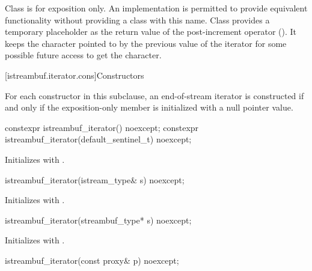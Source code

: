 \pnum
Class
is for exposition only.
An implementation is permitted to provide equivalent functionality without
providing a class with this name.
Class
provides a temporary
placeholder as the return value of the post-increment operator
().
It keeps the character pointed to by the previous value
of the iterator for some possible future access to get the character.

[istreambuf.iterator.cons]{Constructors}

\pnum
For each  constructor in this subclause,
an end-of-stream iterator is constructed if and only if
the exposition-only member  is initialized with a null pointer value.


%
\begin{itemdecl}
constexpr istreambuf_iterator() noexcept;
constexpr istreambuf_iterator(default_sentinel_t) noexcept;
\end{itemdecl}

\begin{itemdescr}
\pnum
\effects
Initializes  with .
\end{itemdescr}


%
\begin{itemdecl}
istreambuf_iterator(istream_type& s) noexcept;
\end{itemdecl}

\begin{itemdescr}
\pnum
\effects
Initializes  with .
\end{itemdescr}


%
\begin{itemdecl}
istreambuf_iterator(streambuf_type* s) noexcept;
\end{itemdecl}

\begin{itemdescr}
\pnum
\effects
Initializes  with .
\end{itemdescr}


%
\begin{itemdecl}
istreambuf_iterator(const proxy& p) noexcept;
\end{itemdecl}

